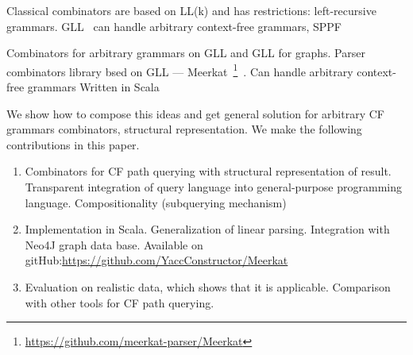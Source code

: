 Classical combinators are based on LL(k) and has restrictions: left-recursive grammars.
GLL~\cite{scott2010gll} can handle arbitrary context-free grammars, SPPF~\cite{SPPF}

Combinators for arbitrary grammars on GLL and GLL for graphs. 
Parser combinators library bsed on GLL --- 
Meerkat~\footnote{\url{https://github.com/meerkat-parser/Meerkat}}~\cite{Meerkat}. 
Can handle arbitrary context-free grammars
Written in Scala

We show how to compose this ideas and get general solution for arbitrary CF grammars combinators, structural representation.
We make the following contributions in this paper.

\begin{enumerate}
\item Combinators for CF path querying with structural representation of result.
 Transparent integration of query language into general-purpose programming language. Compositionality (subquerying mechanism)
\item Implementation in Scala. Generalization of linear parsing. Integration with Neo4J graph data base. Available on gitHub:\url{https://github.com/YaccConstructor/Meerkat}
\item Evaluation on realistic data, which shows that it is applicable. Comparison  with other tools 
for CF path querying.
\end{enumerate}